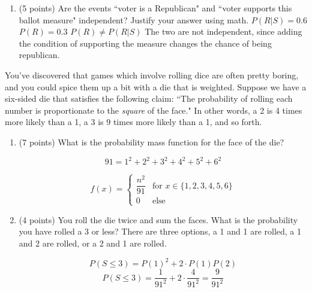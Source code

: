 \documentclass[addpoints]{exam}
\begin{document}
{\begin{questions}
\begin{enumerate}[label=(\alph*)]
		$P(R | S) = \dfrac{P(S | R)P(R)}{P(S)}$ \newline
		$P(R | S) = \dfrac{0.8 \cdot 0.3}{0.4} = 0.6$ \newline

		\item (5 points) Are the events ``voter is a Republican" and ``voter supports this ballot measure" independent? Justify your answer using math. \newline
		$P(R | S) = 0.6$ \newline
		$P(R) = 0.3$ \newline
		$P(R) \neq P(R | S)$ \newline
		The two are not independent, since adding the condition of supporting the measure changes the chance of being republican.

	\end{enumerate}

\vspace{6cm}
\question[15] You've discovered that games which involve rolling dice are often pretty boring, and you could spice them up a bit with a die that is weighted.  Suppose we have a six-sided die that satisfies the following claim:
``The probability of rolling each number is proportionate to the \textit{square} of the face."  In other words, a 2 is 4 times more likely than a 1, a 3 is 9 times more likely than a 1, and so forth.
\begin{enumerate}[label=(\alph*)]
	\item (7 points) What is the probability mass function for the face of the die? \newline

	$$91 = 1^2 + 2^2 + 3^2 + 4^2 + 5^2 + 6^2$$

	$$f(x)=\begin{cases}
    \dfrac{n^2}{91} & \text{for } x \in \{1,2,3,4,5,6\}\\
    0 & \text{else}
    \end{cases}$$

	\item (4 points) You roll the die twice and sum the faces.  What is the probability you have rolled a 3 or less?
	There are three options, a 1 and 1 are rolled, a 1 and 2 are rolled, or a 2 and 1 are rolled. \newline

	$$P(S \leq 3) = P(1)^2 + 2 \cdot P(1)P(2)$$
	$$P(S \leq 3) = \dfrac{1}{91^2} + 2 \cdot \dfrac{4}{91^2} = \dfrac{9}{91^2}$$ \newline


\end{enumerate}
\end{questions}}
\end{document}
